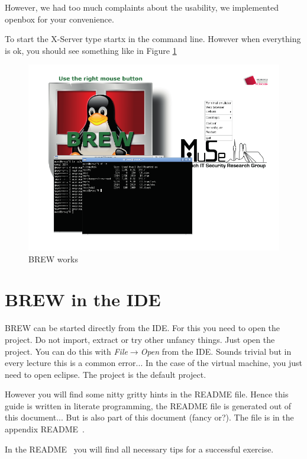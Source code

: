 \documentclass{llncs}%
\begin{document}
However, we had too much complaints about the usability, we implemented openbox for your convenience.

To start the X-Server type {\Tt{}startx\nwendquote} in the command line.
However when everything is ok, you should see something like in Figure \ref{fig:brewwork}

\begin{figure}
\centering
\includegraphics[width=1\textwidth]{running_brew}
\caption{BREW works} 
\label{fig:brewwork}
\end{figure}

\section{BREW in the IDE}
BREW can be started directly from the IDE. For this you need to open the project. Do not import, extract or try other unfancy things. Just open the project. You can do this with {\em File$\rightarrow$Open} from the IDE. Sounds trivial but in every lecture this is a common error...
In the case of the virtual machine, you just need to open eclipse. The project is the default project.

However you will find some nitty gritty hints in the README file. Hence this guide is written in literate programming, the README file is generated out of this document...
But is also part of this document (fancy or?). The file is in the appendix {\Tt{}\LA{}README~{\nwtagstyle{}}\RA{}\nwendquote}.

In the {\Tt{}\LA{}README~{\nwtagstyle{}}\RA{}\nwendquote} you will find all necessary tips for a successful exercise.
\end{document}
